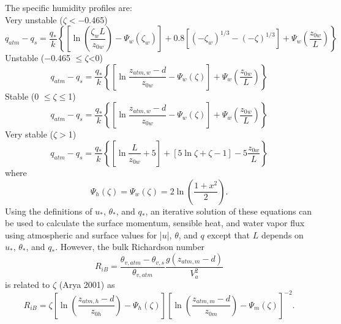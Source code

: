\documentclass[12pt,authoryear]{elsarticle}
\numberwithin{equation}{section} %
\begin{document}
The specific humidity profiles are: \\
Very unstable ($\zeta<-$0.465)
\begin{equation}
q_{atm}-q_s=\frac{q_*}{k}
\left\{
\left[
\ln\left(\frac{\zeta_w L}{z_{0w}}\right)-\Psi_w(\zeta_w)
\right] + 0.8\left[(-\zeta_{w})^{1/3}-(-\zeta)^{1/3}
\right] + \Psi_{w}\left(\frac{z_{0w}}{L}\right)
\right\}
\end{equation}
Unstable ($-$0.465 $\leq \zeta$<0)
\begin{equation}
q_{atm}-q_{s}=\frac{q_*}{k}\left\{\left[\ln \frac{z_{atm,w}-d}{z_{0w}}-\Psi_{w}(\zeta)\right]+\Psi_{w}\left(\frac{z_{0w}}{L}\right)\right\}
\end{equation}
Stable (0 $\leq \zeta \leq$1)
\begin{equation}
q_{atm}-q_{s}= \frac{q_*}{k}\left\{\left[\ln \frac{z_{atm,w}-d}{z_{0w}}-\Psi_w(\zeta)\right]+\Psi_{w}\left(\frac{z_{0w}}{L}\right)\right\}
\end{equation}
Very stable ($\zeta>$1)
\begin{equation}
\label{eq:specific_humidity_very_stable}
q_{atm}-q_{s}= \frac{q_*}{k}\left\{\left[\ln \frac{L}{z_{0w}}+5\right]+\left[5\ln\zeta+\zeta-1\right]-5\frac{z_{0w}}{L}\right\}
\end{equation}
where
\begin{equation}
\label{eq:integrated_correction_momentum_heat}
\Psi_{h}(\zeta)=\Psi_{w}(\zeta)=2\ln\left(\frac{1+x^2}{2}\right).
\end{equation}
Using the definitions of $u_*$, $\theta_*$, and $q_*$, an iterative solution of these equations can be used to calculate the surface momentum, sensible heat, and water vapor flux using atmospheric and surface values for |$u$|, $\theta$, and $q$ except that $L$ depends on $u_*$, $\theta_*$, and $q_*$. However, the bulk Richardson number 
\begin{equation}
\label{eq:bulk_richardson_number}
R_{iB} = \frac{\theta_{v,atm}-\theta_{v,s}}{\theta_{v,atm}}\frac{g(z_{atm,m}-d)}{V_{a}^2}
\end{equation}
is related to $\zeta$ (Arya 2001) as
\begin{equation}
R_{iB} = \zeta \left[\ln\left(\frac{z_{atm,h}-d}{z_{0h}}\right)-\Psi_{h}(\zeta)\right]\left[\ln\left(\frac{z_{atm,m}-d}{z_{0m}}\right)-\Psi_{m}(\zeta)\right]^{-2}.
\end{equation}
\end{document}

